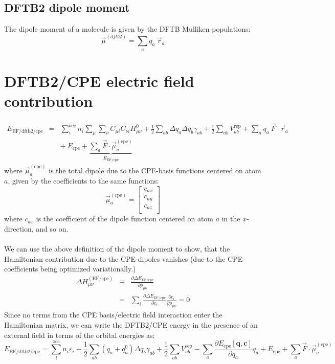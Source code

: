 \documentclass{article}
\numberwithin{equation}{section}
\begin{document}
\subsection{DFTB2 dipole moment}
The dipole moment of a molecule is given by the DFTB Mulliken populations:
\begin{equation}
    \vec{\mu}^{(dftb2)} = \sum_a q_a\ \vec{r}_a
\end{equation}


\section{DFTB2/CPE electric field contribution}
\begin{eqnarray}
    E_\mathrm{EF/dftb2/cpe} 
    &=& \sum_i^\mathrm{occ} n_i  \sum_\mu \sum_\nu C_{\mu i}  C_{\nu i} H^0_{\mu\nu} + \frac{1}{2} \sum_{ab} \Delta q_a \Delta q_b \gamma_{ab}+ \frac{1}{2} \sum_{ab} V^\mathrm{rep}_{ab} + \sum_a q_a\ \vec{F} \cdot \vec{r}_a\nonumber\\
    && +\ E_{\mathrm{cpe}} + \underbrace{\sum_a \vec{F} \cdot \vec{\mu}^{\mathrm{(cpe)}}_a}_{E_{\mathrm{EF/cpe}}}
\end{eqnarray}
where $\vec{\mu}^{\mathrm{(cpe)}}_a$ is the total dipole due to the CPE-basis functions centered on atom $a$, given by the coefficients to the same functions:
\begin{equation}
    \vec{\mu}^{\mathrm{(cpe)}}_a =  
    \begin{bmatrix}
        c_{ax}\\
        c_{ay}\\
        c_{az}\\
    \end{bmatrix}
\end{equation}
where $c_{ax}$ is the coefficient of the dipole function centered on atom $a$ in the $x$-direction, and so on.
\\\\We can use the above definition of the dipole moment to show, that the Hamiltonian contribution due to the CPE-dipoles vanishes (due to the CPE-coefficients being optimized variationally.)
\begin{eqnarray}
    \Delta H_{\mu\nu}^{\mathrm{(EF/cpe)}} 
    &\equiv& \frac{\partial \Delta E_{\mathrm{EF/cpe}}}{\partial \rho_{\mu\nu}}\nonumber\\
    &=&  \sum_i \frac{\partial \Delta E_{\mathrm{EF/cpe}}}{\partial c_i} 
     \frac{\partial c_i}{\partial \rho_{\mu\nu}}= 0
\end{eqnarray}
Since no terms from the CPE basis/electric field interaction enter the Hamiltonian matrix, we can write the DFTB2/CPE energy in the presence of an external field in terms of the orbital energies as:
\begin{equation}
    E_\mathrm{EF/dftb2/cpe}  
    = \sum_i^\mathrm{occ} n_i \varepsilon_i - \frac{1}{2}\sum_{ab} \left(q_a + q_a^0 \right)\Delta q_b \gamma_{ab} + \frac{1}{2} \sum_{ab} V^\mathrm{rep}_{ab} - \sum_a  \frac{\partial E_{\mathrm{cpe}}\left[\mathbf{q}, \mathbf{c}\right]}{\partial q_a} q_a + E_{\mathrm{cpe}} + \sum_a \vec{F} \cdot \vec{\mu}^{\mathrm{(cpe)}}_a
\end{equation}
\end{document}
